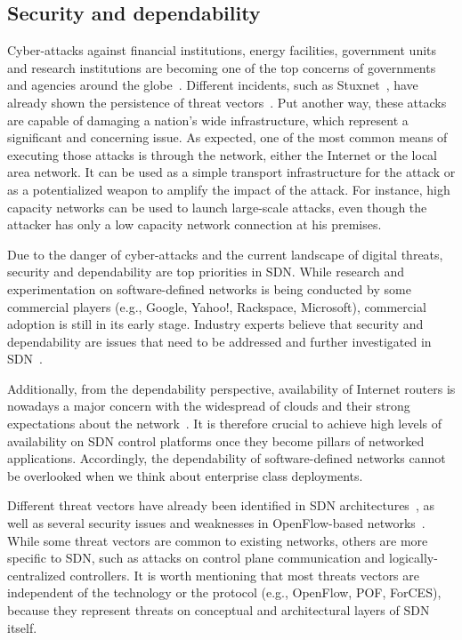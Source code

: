 
\subsection{Security and dependability}
\label{secSecurity}

Cyber-attacks against financial institutions, energy facilities, government units and research institutions 
are becoming one of the top concerns of governments and agencies around the globe~\cite{marchetti2012,amin2012,nicholson2012,choo2011,kushner2013,perez-pena2013}.
Different incidents, such as Stuxnet~\cite{kushner2013}, have already shown the persistence of threat
vectors~\cite{tankard2011}. Put another way, these attacks are capable of damaging a nation's wide 
infrastructure, which represent a significant and concerning issue. As expected, one of the most common means 
of executing those attacks is through the network, either the Internet or the local area network. It can be used 
as a simple transport infrastructure for the attack or as a potentialized weapon to amplify the impact of the 
attack. For instance, high capacity networks can be used to launch large-scale attacks, even though the attacker 
has only a low capacity network connection at his premises.

Due to the danger of cyber-attacks and the current landscape of digital threats, security and dependability are 
top priorities in SDN. While research and experimentation on software-defined networks is being conducted by 
some commercial players (e.g., Google, Yahoo!, Rackspace, Microsoft), commercial adoption is still in its early 
stage. Industry experts believe that security and dependability are issues that need to be addressed and further 
investigated in SDN~\cite{kreutz2013,sorensen2012,kerner2013}.

Additionally, from the dependability perspective, availability of Internet routers is nowadays a major concern 
with the widespread of clouds and their strong expectations about the network~\cite{agapi2011}. It is 
therefore crucial to achieve high levels of availability on SDN control platforms once they become pillars of
networked applications. Accordingly, the dependability of software-defined networks cannot be overlooked when 
we think about enterprise class deployments.

Different threat vectors have already been identified in SDN architectures~\cite{kreutz2013}, as well 
as several security issues and weaknesses in OpenFlow-based networks~\cite{kloti2013,wasserman2013,shin2013,porras2012,benton2013}.
While some threat vectors are common to existing networks, others are more specific to SDN, such as attacks on 
control plane communication and logically-centralized controllers. It is worth mentioning that most threats vectors 
are independent of the technology or the protocol (e.g., OpenFlow, POF, ForCES), because they represent threats on 
conceptual and architectural layers of SDN itself.

